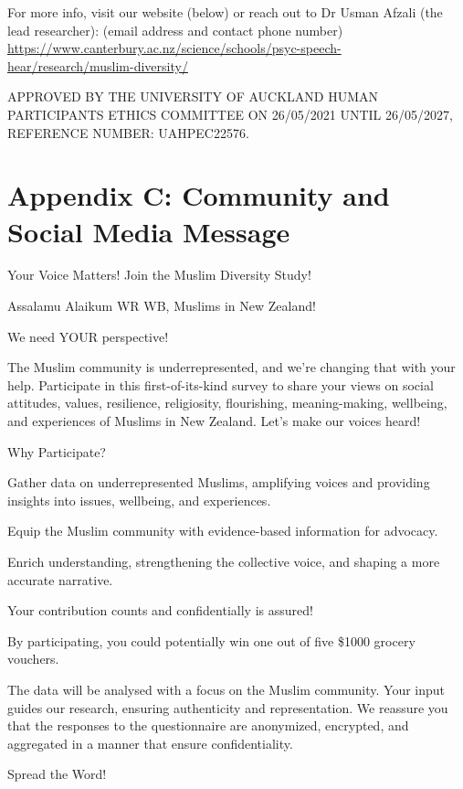 \documentclass[
]{interact}
\begin{document}
\noindent For more info, visit our website (below) or reach out to Dr
Usman Afzali (the lead researcher): (email address and contact phone
number)
\url{https://www.canterbury.ac.nz/science/schools/psyc-speech-hear/research/muslim-diversity/}

\noindent APPROVED BY THE UNIVERSITY OF AUCKLAND HUMAN PARTICIPANTS
ETHICS COMMITTEE ON 26/05/2021 UNTIL 26/05/2027, REFERENCE NUMBER:
UAHPEC22576.

\newpage{}

\section{Appendix C: Community and Social Media
Message}\label{appendix-c-community-and-social-media-message}

Your Voice Matters! Join the Muslim Diversity Study!

\noindent Assalamu Alaikum WR WB, Muslims in New Zealand!

\noindent We need YOUR perspective!

\noindent The Muslim community is underrepresented, and we're changing
that with your help. Participate in this first-of-its-kind survey to
share your views on social attitudes, values, resilience, religiosity,
flourishing, meaning-making, wellbeing, and experiences of Muslims in
New Zealand. Let's make our voices heard!

\noindent Why Participate?

\noindent Gather data on underrepresented Muslims, amplifying voices and
providing insights into issues, wellbeing, and experiences.

\noindent Equip the Muslim community with evidence-based information for
advocacy.

\noindent Enrich understanding, strengthening the collective voice, and
shaping a more accurate narrative.

\noindent Your contribution counts and confidentially is assured!

\noindent By participating, you could potentially win one out of five
\$1000 grocery vouchers.

\noindent The data will be analysed with a focus on the Muslim
community. Your input guides our research, ensuring authenticity and
representation. We reassure you that the responses to the questionnaire
are anonymized, encrypted, and aggregated in a manner that ensure
confidentiality.

\noindent Spread the Word!
\end{document}

